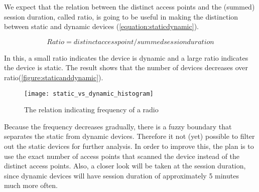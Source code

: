 We expect that the relation between the distinct access points and the (summed) session duration, called ratio, is going to be useful in making the distinction between static and dynamic devices (\autoref{equation:staticdynamic}).

\begin{equation}\label{equation:staticdynamic}
Ratio = distinct access point / summed session duration
\end{equation}

In this, a small ratio indicates the device is dynamic and a large ratio indicates the device is static. The result shows that the number of devices decreases over ratio(\autoref{figure:staticanddynamic}).
\begin{figure}[H]
\centering
\texttt{[image: static\_vs\_dynamic\_histogram]}
\captionsetup{justification=centering}
\caption{The relation indicating frequency of a radio}
\label{figure:staticanddynamic}
\end{figure}

Because the frequency decreases gradually, there is a fuzzy boundary that separates the static from dynamic devices. Therefore it not (yet) possible to filter out the static devices for further analysis. In order to improve this, the plan is to use the exact number of access points that scanned the device instead of the distinct access points. Also, a closer look will be taken at the session duration, since dynamic devices will have session duration of approximately 5 minutes much more often. 
